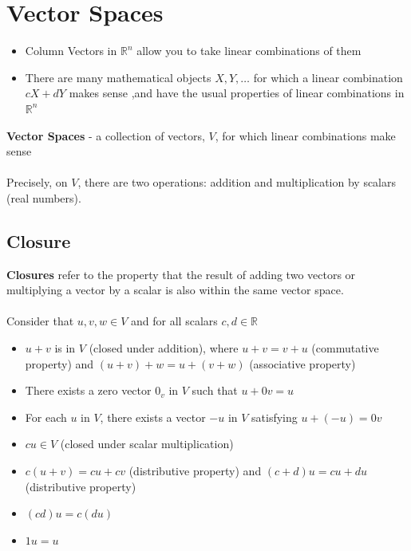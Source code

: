\section{Vector Spaces}
\begin{itemize}
  \item Column Vectors in $\mathbb{R}^n$ allow you to take linear combinations of them 
  \item There are many mathematical objects $X, Y, \dots$ for which a linear combination 
    $cX + dY$ makes sense ,and have the usual properties of linear combinations in $\mathbb{R}^n$
\end{itemize}
\textbf{Vector Spaces} - a collection of vectors, $V$, for which linear combinations make sense \\\\
Precisely, on $V$, there are two operations: addition and multiplication by scalars (real numbers). 
\subsection{Closure}
\textbf{Closures} refer to the property that the result of adding two vectors or multiplying a vector by 
a scalar is also within the same vector space. \\\\
Consider that $u, v, w \in V$ and for all scalars $c, d \in \mathbb{R}$
\begin{itemize}
  \item $u + v$ is in $V$ (closed under addition), where $u + v = v + u$ (commutative property) 
    and $(u + v) + w = u + (v + w)$ (associative property)
  \item There exists a zero vector $0_v$ in $V$ such that $u + 0v = u$ 
  \item For each $u$ in $V$, there exists a vector $-u$ in $V$ satisfying $u + (-u) = 0v$ 
  \item $cu \in V$ (closed under scalar multiplication) 
  \item $c(u + v) = cu + cv$ (distributive property) and 
    $(c + d)u = cu + du$ (distributive property)
  \item $(cd)u = c(du)$
  \item $1u = u$
\end{itemize}
